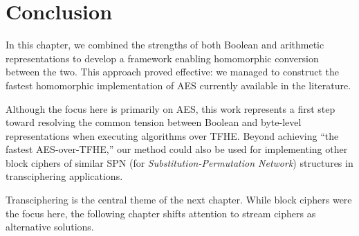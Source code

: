 \section{Conclusion}


In this chapter, we combined the strengths of both Boolean and arithmetic representations to develop a framework enabling homomorphic conversion between the two. This approach proved effective: we managed to construct the fastest homomorphic implementation of AES currently available in the literature.

Although the focus here is primarily on AES, this work represents a first step toward resolving the common tension between Boolean and byte-level representations when executing algorithms over TFHE. Beyond achieving “the fastest AES-over-TFHE,” our method could also be used for implementing other block ciphers of similar SPN (for \textit{Substitution-Permutation Network}) structures in transciphering applications.

Transciphering is the central theme of the next chapter. While block ciphers were the focus here, the following chapter shifts attention to stream ciphers as alternative solutions. 